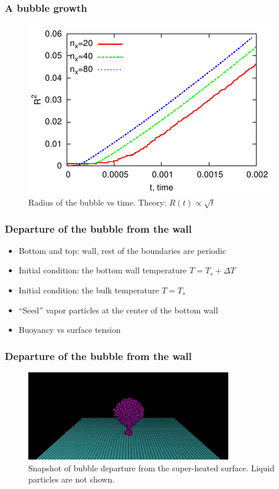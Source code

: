 \begin{frame}
  \frametitle{A bubble growth}
  \begin{figure}[ht]
    \centering
    \includegraphics{gnuplot/f1.pdf}
    \caption{Radius of the bubble vs time. Theory: $R(t) \propto \sqrt{t}$}
    \label{fig:dep}
  \end{figure}
\end{frame}

\begin{frame}
  \frametitle{Departure of the bubble from the wall}
  \begin{itemize}
  \item Bottom and top: wall, rest of the boundaries are periodic
  \item Initial condition: the bottom wall temperature $T=T_s + \Delta T$
  \item Initial condition: the bulk temperature $T=T_s$
  \item ``Seed'' vapor particles at the center of the bottom wall
  \item Buoyancy vs surface tension
  \end{itemize}
\end{frame}

\begin{frame}
  \frametitle{Departure of the bubble from the wall}
  \begin{figure}[ht]
    \centering
    \includegraphics[width=0.8\textwidth]{gnuplot/dep-59.pdf}
    \caption{Snapshot of bubble departure from the super-heated
      surface. Liquid particles are not shown.}
    \label{fig:snapshot}
  \end{figure}
\end{frame}

